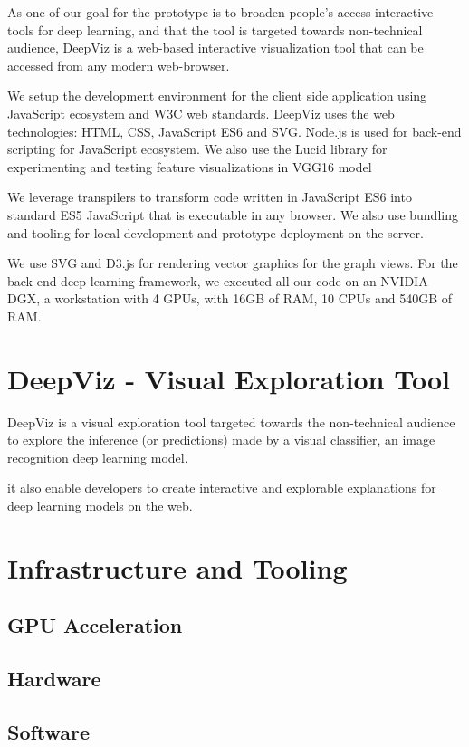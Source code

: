 As one of our goal for the prototype is to broaden people's access interactive tools for deep learning, and that the tool is targeted towards non-technical audience, DeepViz is a web-based interactive visualization tool that can be accessed from any modern web-browser. 

We setup the development environment for the client side application using JavaScript ecosystem and W3C web standards. DeepViz uses the web technologies: HTML, CSS, JavaScript ES6 and SVG. Node.js is used for back-end scripting for JavaScript ecosystem. We also use the Lucid library for experimenting and testing feature visualizations in VGG16 model

We leverage transpilers to transform code written in JavaScript ES6 into standard ES5 JavaScript that is executable in any browser. We also use bundling and tooling for local development and prototype deployment on the server.

We use SVG and D3.js for rendering vector graphics for the graph views. For the back-end deep learning framework, we executed all our code on an NVIDIA DGX, a workstation with 4 GPUs, with 16GB of RAM, 10 CPUs and 540GB of RAM.

\section{DeepViz - Visual Exploration Tool}

DeepViz is a visual exploration tool targeted towards the non-technical audience to explore the inference (or predictions) made by a visual classifier, an image recognition deep learning model.

it also enable developers to create interactive and explorable explanations for deep learning models on the web.

\iffalse
\section{Infrastructure and Tooling}
    \subsection{GPU Acceleration}
\subsection{Hardware}
\subsection{Software}
